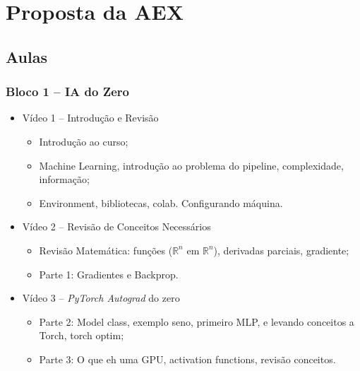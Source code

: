 \documentclass[a4paper,12pt, brazil]{article}
\begin{document}
    
    \newpage
    
    \section*{Proposta da AEX}
    
    \subsection*{Aulas}
    \subsubsection*{Bloco 1 -- IA do Zero}
    \begin{itemize}
        \item Vídeo 1 -- Introdução e Revisão
        \begin{itemize}
            \item Introdução ao curso;
            \item Machine Learning, introdução ao problema do pipeline, complexidade, informação;
            \item Environment, bibliotecas, colab. Configurando máquina.
        \end{itemize}
    
        \item Vídeo 2 -- Revisão de Conceitos Necessários
        \begin{itemize}
            \item Revisão Matemática: funções ($\mathbb{R}^n$ em $\mathbb{R}^n$), derivadas parciais, gradiente;
            \item Parte 1: Gradientes e Backprop.
        \end{itemize}
            
        \item Vídeo 3 -- \emph{PyTorch Autograd} do zero
            \begin{itemize}
                \item Parte 2: Model class, exemplo seno, primeiro MLP, e levando conceitos a Torch, torch optim;
                \item Parte 3: O que eh uma GPU, activation functions, revisão conceitos.
            \end{itemize} 
    \end{itemize}
    
\end{document}

